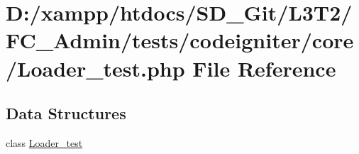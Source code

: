 \hypertarget{_admin_2tests_2codeigniter_2core_2_loader__test_8php}{}\section{D\+:/xampp/htdocs/\+S\+D\+\_\+\+Git/\+L3\+T2/\+F\+C\+\_\+\+Admin/tests/codeigniter/core/\+Loader\+\_\+test.php File Reference}
\label{_admin_2tests_2codeigniter_2core_2_loader__test_8php}
\subsection*{Data Structures}
\begin{DoxyCompactItemize}
\item 
class \hyperlink{class_loader__test}{Loader\+\_\+test}
\end{DoxyCompactItemize}
